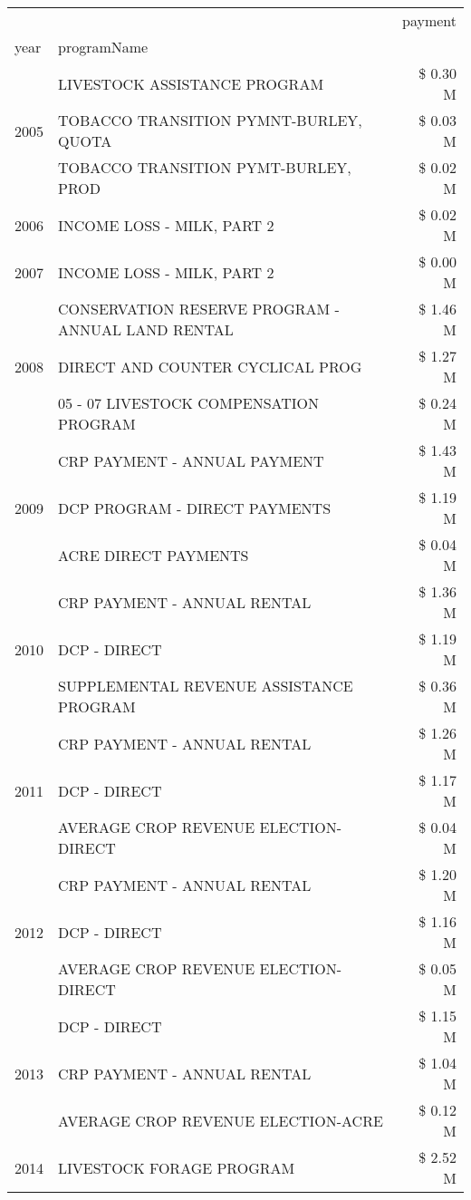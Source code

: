 \begin{tabular}{llr}
\toprule
 &  & payment \\
year & programName &  \\
\midrule
\multirow[t]{3}{*}{2005} & LIVESTOCK ASSISTANCE PROGRAM & \$ 0.30 M \\
 & TOBACCO TRANSITION PYMNT-BURLEY, QUOTA & \$ 0.03 M \\
 & TOBACCO TRANSITION PYMT-BURLEY, PROD & \$ 0.02 M \\
\cline{1-3}
2006 & INCOME LOSS - MILK, PART 2 & \$ 0.02 M \\
\cline{1-3}
2007 & INCOME LOSS - MILK, PART 2 & \$ 0.00 M \\
\cline{1-3}
\multirow[t]{3}{*}{2008} & CONSERVATION RESERVE PROGRAM - ANNUAL LAND RENTAL & \$ 1.46 M \\
 & DIRECT AND COUNTER CYCLICAL PROG & \$ 1.27 M \\
 & 05 - 07 LIVESTOCK COMPENSATION PROGRAM & \$ 0.24 M \\
\cline{1-3}
\multirow[t]{3}{*}{2009} & CRP PAYMENT - ANNUAL PAYMENT & \$ 1.43 M \\
 & DCP PROGRAM - DIRECT PAYMENTS & \$ 1.19 M \\
 & ACRE DIRECT PAYMENTS & \$ 0.04 M \\
\cline{1-3}
\multirow[t]{3}{*}{2010} & CRP PAYMENT - ANNUAL RENTAL & \$ 1.36 M \\
 & DCP - DIRECT & \$ 1.19 M \\
 & SUPPLEMENTAL REVENUE ASSISTANCE PROGRAM & \$ 0.36 M \\
\cline{1-3}
\multirow[t]{3}{*}{2011} & CRP PAYMENT - ANNUAL RENTAL & \$ 1.26 M \\
 & DCP - DIRECT & \$ 1.17 M \\
 & AVERAGE CROP REVENUE ELECTION-DIRECT & \$ 0.04 M \\
\cline{1-3}
\multirow[t]{3}{*}{2012} & CRP PAYMENT - ANNUAL RENTAL & \$ 1.20 M \\
 & DCP - DIRECT & \$ 1.16 M \\
 & AVERAGE CROP REVENUE ELECTION-DIRECT & \$ 0.05 M \\
\cline{1-3}
\multirow[t]{3}{*}{2013} & DCP - DIRECT & \$ 1.15 M \\
 & CRP PAYMENT - ANNUAL RENTAL & \$ 1.04 M \\
 & AVERAGE CROP REVENUE ELECTION-ACRE & \$ 0.12 M \\
\cline{1-3}
\multirow[t]{3}{*}{2014} & LIVESTOCK FORAGE PROGRAM & \$ 2.52 M \\

\end{tabular}

